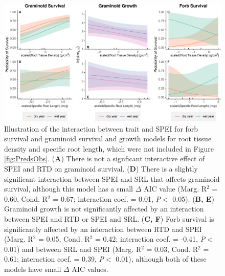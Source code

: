 \documentclass[12pt, letterpaper]{article}
\begin{document}
\begin{figure}
\includegraphics[width=.8\textwidth]{suppObservationsFig-1.pdf}
\caption{\small{
Illustration of the interaction between trait and SPEI for forb survival and graminoid survival and growth models for root tissue density and specific root length, which were not included in Figure \ref{fig:PredsObs}.  (\textbf{A}) There is not a signficant interactive effect of SPEI and RTD on graminoid survival. (\textbf{D}) There is a slightly significant interaction between SPEI and SRL that affects graminoid survival, although this model has a small $\Delta$ AIC value (Marg. R$^2$ = 0.60, Cond. R$^2$ = 0.67; interaction coef. = 0.01, \textit{P}$<$ 0.05). (\textbf{B, E}) Graminoid growth is not significantly affected by an interaction between SPEI and RTD or SPEI and SRL. (\textbf{C, F}) Forb survival is significantly affected by an interaction between RTD and SPEI (Marg. R$^2$ = 0.05, Cond. R$^2$ = 0.42; interaction coef. = -0.41, \textit{P}$<$ 0.01) and between SRL and SPEI (Marg. R$^2$ = 0.03, Cond. R$^2$ = 0.61; interaction coef. = 0.39, \textit{P}$<$ 0.01), although both of these models have small $\Delta$ AIC values.
}}
\label{fig:GramSurv_all}
\end{figure}
\end{document}
